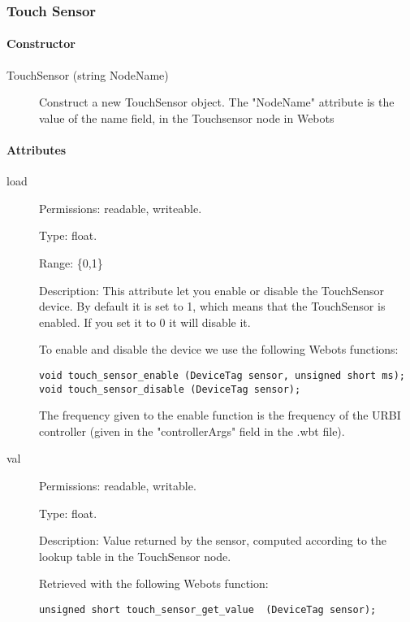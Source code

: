 \subsubsection{Touch Sensor}
\label{webots.uobjects.robotdevices.touchsensor}%

\paragraph{Constructor}
\label{webots.uobjects.robotdevices.touchsensor.constructor}%

\noindent
\begin{description}
\item[{TouchSensor (string NodeName)}]            Construct a new TouchSensor object. The "NodeName" attribute is the value
          of the name field, in the Touchsensor node in Webots

\end{description}

\paragraph{Attributes}
\label{webots.uobjects.robotdevices.touchsensor.attributes}%

\noindent
\begin{description}
\item[{load}]     Permissions: readable, writeable.


  Type: float.


  Range: \{0,1\}


  Description: This attribute let you enable or disable the
  TouchSensor device.  By default it is set to 1, which means that the
  TouchSensor is enabled. If you set it to 0 it will disable it.


  To enable and disable the device we use the following Webots
  functions:


\begin{lstlisting}
void touch_sensor_enable (DeviceTag sensor, unsigned short ms);
void touch_sensor_disable (DeviceTag sensor);
\end{lstlisting}

          The frequency given to the enable function is the frequency of the
          URBI controller (given in the "controllerArgs" field in the .wbt file).

\item[{val}]             Permissions: readable, writable.


  Type: float.


  Description: Value returned by the sensor, computed according to the
  lookup table in the TouchSensor node.


          Retrieved with the following Webots function:


\begin{lstlisting}
unsigned short touch_sensor_get_value  (DeviceTag sensor);
\end{lstlisting}
\end{description}

